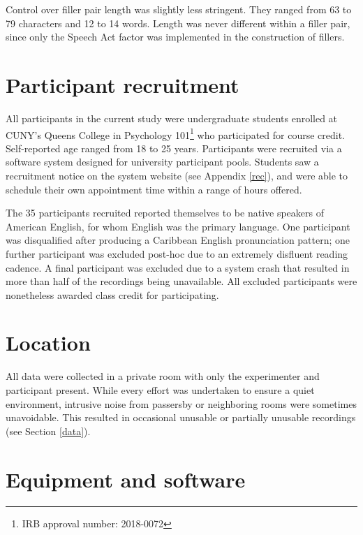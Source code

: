 \documentclass[11pt,oneside]{book}
\let\rmarkdownfootnote\footnote%
\def\footnote{\protect\rmarkdownfootnote}
\begin{document}
Control over filler pair length was slightly less stringent. They ranged from 63 to 79 characters and 12 to 14 words. Length was never different within a filler pair, since only the Speech Act factor was implemented in the construction of fillers.

\hypertarget{parti}{%
\section{Participant recruitment}\label{parti}}

All participants in the current study were undergraduate students enrolled at CUNY's Queens College in Psychology 101\footnote{IRB approval number: 2018-0072} who participated for course credit. Self-reported age ranged from 18 to 25 years. Participants were recruited via a software system designed for university participant pools. Students saw a recruitment notice on the system website (see Appendix \ref{rec}), and were able to schedule their own appointment time within a range of hours offered.

The 35 participants recruited reported themselves to be native speakers of American English, for whom English was the primary language. One participant was disqualified after producing a Caribbean English pronunciation pattern; one further participant was excluded post-hoc due to an extremely disfluent reading cadence. A final participant was excluded due to a system crash that resulted in more than half of the recordings being unavailable. All excluded participants were nonetheless awarded class credit for participating.

\hypertarget{location}{%
\section{Location}\label{location}}

All data were collected in a private room with only the experimenter and participant present. While every effort was undertaken to ensure a quiet environment, intrusive noise from passersby or neighboring rooms were sometimes unavoidable. This resulted in occasional unusable or partially unusable recordings (see Section \ref{data}).

\hypertarget{equipment-and-software}{%
\section{Equipment and software}\label{equipment-and-software}}
\end{document}
